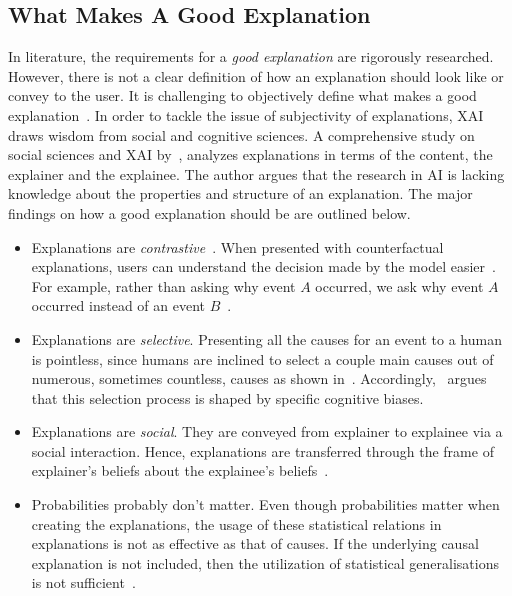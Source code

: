 \subsection{What Makes A Good Explanation}
\label{subsec:explainableArtificialIntelligence_AGoodExplanation}
In literature, the requirements for a \emph{good explanation} are rigorously researched. However, there is not a clear definition of how an explanation should look like or convey to the user. It is challenging to objectively define what makes a good explanation~\parencite{XAIConceptsTaxonomies_Arrieta}. In order to tackle the issue of subjectivity of explanations, XAI draws wisdom from social and cognitive sciences. A comprehensive study on social sciences and XAI by~\cite{ExplanationInAI_Miller}, analyzes explanations in terms of the content, the explainer and the explainee. The author argues that the research in AI is lacking knowledge about the properties and structure of an explanation.  The major findings on how a good explanation should be are outlined below.
\begin{itemize}
    \item Explanations are \emph{contrastive}~\parencite{ContrastiveExplanation_Lipton, XAI_BewareInmatesRunningTheAsylum_Miller}. When presented with counterfactual explanations, users can understand the decision made by the model easier~\parencite{ExplainableAndInterpretableModels_Escalante, MLCVPatternRecognition_Lopez, MLCVPatternRecognition_Lopez, CounterfactualsInXAI_Byrne}. For example, rather than asking why event $A$ occurred, we ask why event $A$ occurred instead of an event $B$~\parencite{ExplanationInAI_Miller,XAIConceptsTaxonomies_Arrieta}.
    \item Explanations are \emph{selective}. Presenting all the causes for an event to a human is pointless, since humans are inclined to select a couple main causes out of numerous, sometimes countless, causes as shown in~\parencite{ExplainingCollaborativeFiltering_Herlocker}. Accordingly,~\cite{ExplanationInAI_Miller} argues that this selection process is shaped by specific cognitive biases.
    \item Explanations are \emph{social}. They are conveyed from explainer to explainee via a social interaction. Hence, explanations are transferred through the frame of explainer's beliefs about the explainee's beliefs~\parencite{ExplanationInAI_Miller}.
    \item Probabilities probably don't matter. Even though probabilities matter when creating the explanations, the usage of these statistical relations in explanations is not as effective as that of causes. If the underlying causal explanation is not included, then the utilization of statistical generalisations is not sufficient~\parencite{ExplanationInAI_Miller}.
\end{itemize}

